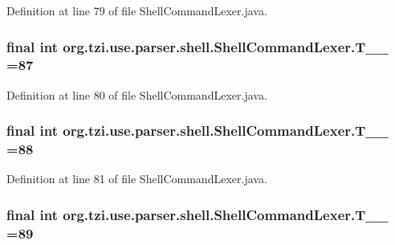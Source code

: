 Definition at line 79 of file Shell\-Command\-Lexer.\-java.

\hypertarget{classorg_1_1tzi_1_1use_1_1parser_1_1shell_1_1_shell_command_lexer_a1f0805515edb21a5189cc21985ede696}{
\subsubsection[{T\-\_\-\-\_\-87}]{\setlength{\rightskip}{0pt plus 5cm}final int org.\-tzi.\-use.\-parser.\-shell.\-Shell\-Command\-Lexer.\-T\-\_\-\-\_ =87\hspace{0.3cm}{\ttfamily [static]}}}\label{classorg_1_1tzi_1_1use_1_1parser_1_1shell_1_1_shell_command_lexer_a1f0805515edb21a5189cc21985ede696}


Definition at line 80 of file Shell\-Command\-Lexer.\-java.

\hypertarget{classorg_1_1tzi_1_1use_1_1parser_1_1shell_1_1_shell_command_lexer_a42a6787b017799262fdc7005e8f33d39}{
\subsubsection[{T\-\_\-\-\_\-88}]{\setlength{\rightskip}{0pt plus 5cm}final int org.\-tzi.\-use.\-parser.\-shell.\-Shell\-Command\-Lexer.\-T\-\_\-\-\_ =88\hspace{0.3cm}{\ttfamily [static]}}}\label{classorg_1_1tzi_1_1use_1_1parser_1_1shell_1_1_shell_command_lexer_a42a6787b017799262fdc7005e8f33d39}


Definition at line 81 of file Shell\-Command\-Lexer.\-java.

\hypertarget{classorg_1_1tzi_1_1use_1_1parser_1_1shell_1_1_shell_command_lexer_a78193664badec8368974701b00bc8a04}{
\subsubsection[{T\-\_\-\-\_\-89}]{\setlength{\rightskip}{0pt plus 5cm}final int org.\-tzi.\-use.\-parser.\-shell.\-Shell\-Command\-Lexer.\-T\-\_\-\-\_ =89\hspace{0.3cm}{\ttfamily [static]}}}\label{classorg_1_1tzi_1_1use_1_1parser_1_1shell_1_1_shell_command_lexer_a78193664badec8368974701b00bc8a04}


